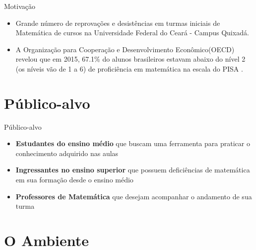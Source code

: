 \documentclass[10pt]{beamer}
\begin{document}
\begin{frame}{Motivação}

\begin{itemize}
	\item Grande número de reprovações e desistências em turmas iniciais de Matemática de cursos na Universidade Federal do Ceará - Campus 
Quixadá.
	\item A Organização para Cooperação e Desenvolvimento Econômico(OECD) revelou que em 2015, 67.1\% do alunos brasileiros estavam abaixo 
do nível 2 (os níveis vão de 1 a 6) de proficiência em matemática na escala do PISA \cite{pisainfocus2016}.
\end{itemize}

\end{frame}

\section{P\'ublico-alvo}
\begin{frame}{Público-alvo}

\begin{itemize}
	\item \textbf{Estudantes do ensino médio} que buscam uma ferramenta para praticar o conhecimento adquirido nas aulas
	\item \textbf{Ingressantes no ensino superior} que possuem deficiências de matemática em sua formação desde o ensino m\'edio
	\item \textbf{Professores de Matemática} que desejam acompanhar o andamento de sua turma
\end{itemize}

\end{frame}

\section{O Ambiente}
\end{document}
